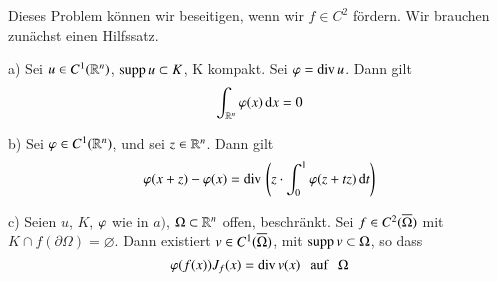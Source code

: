 Dieses Problem können wir beseitigen, wenn wir $f\in C^2$ fördern. Wir brauchen zunächst einen Hilfssatz.

\begin{prop}\label{2.7}
    \begin{description}
        \item{a)}
        Sei $u\in C^1(\mathbb{R}^n)$, $\mathrm{supp}\, u \subset K$, K kompakt. Sei $\varphi=\mathrm{div}\, u$. Dann gilt
        \[
            \int_{\mathbb{R}^n} \varphi (x) \, \mathrm{d} x=0
        \]
        \item{b)}
        Sei $\varphi \in C^1(\mathbb{R}^n)$, und sei $z\in \mathbb{R}^n$. Dann gilt
        \[
            \varphi (x+z)-\varphi(x)=\mathrm{div}\, \left( z\cdot \int_0^1 \varphi (z+tz) \, \mathrm{d} t\right)
        \]
        \item{c)}
        Seien $u$, $K$, $\varphi$ wie in $a)$, $\Omega \subset \mathbb{R}^n$ offen, beschränkt.
        Sei $f\in C^2(\overline \Omega)$ mit $K\cap f(\partial \Omega)=\varnothing$. Dann existiert
        $v\in C^1(\overline \Omega)$, mit $\mathrm{supp}\, v \subset \Omega$, so dass
        \[
            \varphi (f(x))J_f(x)=\mathrm{div}\, v(x) \hspace{.25cm} \text{auf} \hspace{.25cm} \Omega
        \]
    \end{description}
\end{prop}


